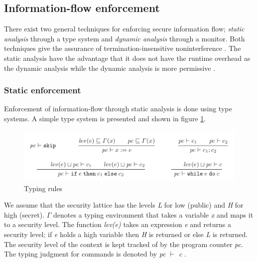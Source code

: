 
\subsection{Information-flow enforcement}
There exist two general techniques for enforcing secure information flow; \emph{static analysis} through a type system and \emph{dynamic analysis} through a monitor. Both techniques give the assurance of termination-insensitive noninterference \cite{Sabelfeld2010}. The static analysis have the advantage that it does not have the runtime overhead as the dynamic analysis while the dynamic analysis is more permissive \cite{Sabelfeld2010}. 


\subsubsection{Static enforcement}
Enforcement of information-flow through static analysis is done using type systems.
A simple type system is presented and shown in figure \ref{fig:typesystem}. 

\begin{figure}[H]
	\centering
	\includegraphics[width=12cm]{figures/securitytypesystem.png}
	\caption{ Typing rules \cite{Sabelfeld2010}}
	\label{fig:typesystem}
\end{figure}

We assume that the security lattice has the levels \emph{L} for low (public) and \emph{H} for high (secret). $\Gamma$ denotes a typing environment that takes a variable \emph{x} and maps it to a security level. The function \emph{lev(e)} takes an expression \emph{e} and returns a security level; if \emph{e} holds a high variable then \emph{H} is returned or else \emph{L} is returned. The security level of the context is kept tracked of by the program counter \emph{pc}. The typing judgment for commands is denoted by \emph{pc $\vdash$ c} \cite{Sabelfeld2010}.

